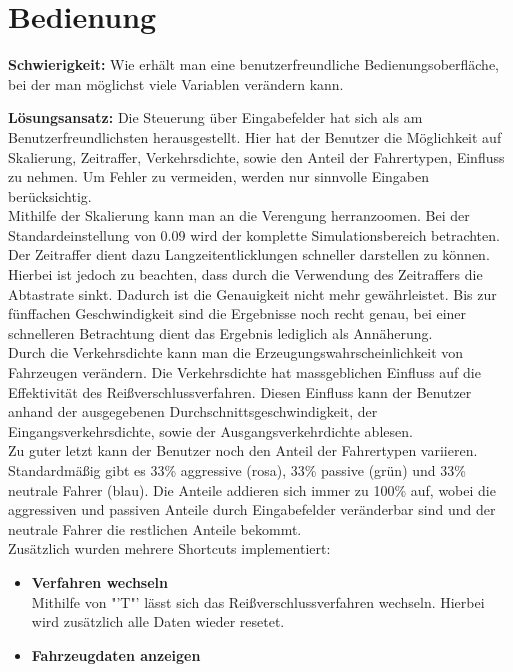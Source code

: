 \section{Bedienung}
\textbf{Schwierigkeit:} Wie erhält man eine benutzerfreundliche Bedienungsoberfläche, bei der man möglichst viele Variablen verändern kann.
\begin{addmargin}[25pt]{0pt}
	\item \textbf{Lösungsansatz:} Die Steuerung über Eingabefelder hat sich als am Benutzerfreundlichsten herausgestellt. Hier hat der Benutzer die Möglichkeit auf Skalierung, Zeitraffer, Verkehrsdichte, sowie den Anteil der Fahrertypen, Einfluss zu nehmen. Um Fehler zu vermeiden, werden nur sinnvolle Eingaben berücksichtig.\\ 
	Mithilfe der Skalierung kann man an die Verengung herranzoomen. Bei der Standardeinstellung von 0.09 wird der komplette Simulationsbereich betrachten.\\ 
	Der Zeitraffer dient dazu Langzeitentlicklungen schneller darstellen zu können. Hierbei ist jedoch zu beachten, dass durch die Verwendung des Zeitraffers die Abtastrate sinkt. Dadurch ist die Genauigkeit nicht mehr gewährleistet. Bis zur fünffachen Geschwindigkeit sind die Ergebnisse noch recht genau, bei einer schnelleren Betrachtung dient das Ergebnis lediglich als Annäherung.\\
	Durch die Verkehrsdichte kann man die Erzeugungswahrscheinlichkeit von Fahrzeugen verändern. Die Verkehrsdichte hat massgeblichen Einfluss auf die Effektivität des Reißverschlussverfahren. Diesen Einfluss kann der Benutzer anhand der ausgegebenen Durchschnittsgeschwindigkeit, der Eingangsverkehrsdichte, sowie der Ausgangsverkehrdichte ablesen.\\
	Zu guter letzt kann der Benutzer noch den Anteil der Fahrertypen variieren. Standardmäßig gibt es 33\% aggressive (rosa), 33\% passive (grün) und 33\% neutrale Fahrer (blau). Die Anteile addieren sich immer zu 100\% auf, wobei die aggressiven und passiven Anteile durch Eingabefelder veränderbar sind und der neutrale Fahrer die restlichen Anteile bekommt.\\
	Zusätzlich wurden mehrere Shortcuts implementiert:
	\begin{itemize}
		\item \textbf{Verfahren wechseln}\\
		Mithilfe von "'T"' lässt sich das Reißverschlussverfahren wechseln. Hierbei wird zusätzlich alle Daten wieder resetet.
		\item \textbf{Fahrzeugdaten anzeigen}\\

\end{itemize}
\end{addmargin}
